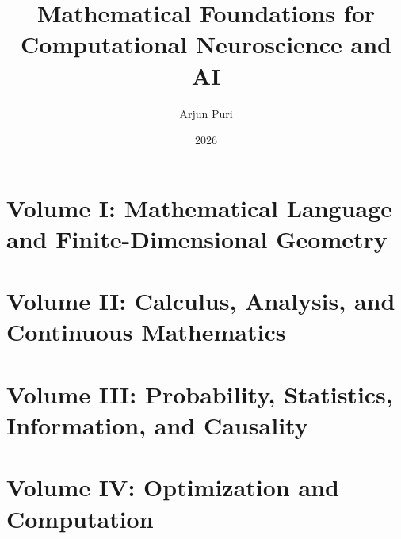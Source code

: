 \documentclass[11pt]{article}
\title{Mathematical Foundations for Computational Neuroscience and AI}
\author{Arjun Puri}
\date{2026}
\begin{document}
            
            \clearpage
            \tableofcontents
            \clearpage
            
            
            \clearpage

            \part{Volume I: Mathematical Language and Finite-Dimensional Geometry}







\part{Volume II: Calculus, Analysis, and Continuous Mathematics}





\part{Volume III: Probability, Statistics, Information, and Causality}







\part{Volume IV: Optimization and Computation}





\end{document}
